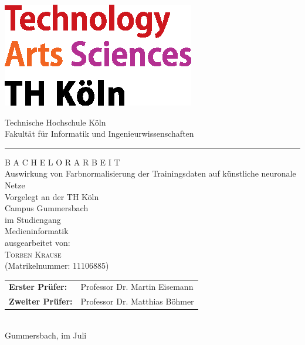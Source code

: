 \documentclass[a4paper,12pt,oneside]{article}
\begin{document}
  
  \newpage
  
  \pagestyle{empty}
  \begin{titlepage}
    \includegraphics[scale=1.00]{Sources/logo_TH-Koeln_CMYK_22pt}\\
    \begin{center}
      \Large
      Technische Hochschule Köln\\
      Fakultät für Informatik und Ingenieurwissenschaften\\
      \hrule\par\rule{0pt}{2cm} %
      \LARGE
      \textsc{B A C H E L O R A R B E I T}\\
      \vspace{1cm} %
      \huge
      Auswirkung von Farbnormalisierung der Trainingsdaten auf künstliche neuronale Netze\\
      \Large
      \vspace{1 cm}
      \large
      Vorgelegt an der TH Köln\\
      Campus Gummersbach\\
      im Studiengang\\
      Medieninformatik\\ 
      \vspace{1.0cm}
      ausgearbeitet von:\\
      \textsc{Torben Krause}\\
      (Matrikelnummer: 11106885)\\
      \vspace{1.5cm}
      \begin{tabular}{ll} %
          \textbf{Erster Prüfer:} & Professor Dr. Martin Eisemann \\
          \textbf{Zweiter Prüfer:} & Professor Dr. Matthias Böhmer \\
      \end{tabular}
      \vspace{1.5cm}
      \\Gummersbach, im Juli
    \end{center}    
  \end{titlepage}
  
\end{document}
